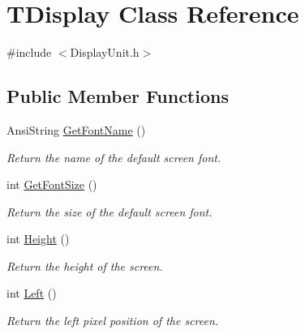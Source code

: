 \hypertarget{class_t_display}{}\section{T\+Display Class Reference}
\label{class_t_display}


{\ttfamily \#include $<$Display\+Unit.\+h$>$}

\subsection*{Public Member Functions}
\begin{DoxyCompactItemize}
\item 
\mbox{\label{class_t_display_aea01e701e8480ffa268b0de85782db80}} 
Ansi\+String \mbox{\hyperlink{class_t_display_aea01e701e8480ffa268b0de85782db80}{Get\+Font\+Name}} ()
\begin{DoxyCompactList}\small\item\em Return the name of the default screen font. \end{DoxyCompactList}\item 
\mbox{\label{class_t_display_a664e19dbba876f346496ad4c6d13c0a3}} 
int \mbox{\hyperlink{class_t_display_a664e19dbba876f346496ad4c6d13c0a3}{Get\+Font\+Size}} ()
\begin{DoxyCompactList}\small\item\em Return the size of the default screen font. \end{DoxyCompactList}\item 
\mbox{\label{class_t_display_a5d3647a144c07e574430e7625e102ca9}} 
int \mbox{\hyperlink{class_t_display_a5d3647a144c07e574430e7625e102ca9}{Height}} ()
\begin{DoxyCompactList}\small\item\em Return the height of the screen. \end{DoxyCompactList}\item 
\mbox{\label{class_t_display_a1b2004c2d76614da605291b06863f340}} 
int \mbox{\hyperlink{class_t_display_a1b2004c2d76614da605291b06863f340}{Left}} ()
\begin{DoxyCompactList}\small\item\em Return the left pixel position of the screen. \end{DoxyCompactList}\item 

\end{DoxyCompactItemize}
